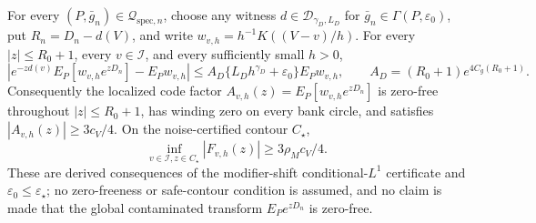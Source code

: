 For every \((P,\bar g_n)\in\mathcal Q_{\mathrm{spec},n}\), choose any witness \(d\in\mathcal D_{\gamma_D,L_D}\) for \(\bar g_n\in\Gamma(P,\varepsilon_0)\), put \(R_n=D_n-d(V)\), and write \(w_{v,h}=h^{-1}K((V-v)/h)\). For every \(|z|\le R_0+1\), every \(v\in\mathcal I\), and every sufficiently small \(h>0\),
\[
 \left|e^{-zd(v)}E_P[w_{v,h}e^{zD_n}]-E_Pw_{v,h}\right|
 \le A_D\{L_Dh^{\gamma_D}+\varepsilon_0\}E_Pw_{v,h},
 \qquad A_D=(R_0+1)e^{4C_g(R_0+1)}.
\]
Consequently the localized code factor \(A_{v,h}(z)=E_P[w_{v,h}e^{zD_n}]\) is zero-free throughout \(|z|\le R_0+1\), has winding zero on every bank circle, and satisfies \(|A_{v,h}(z)|\ge3c_V/4\). On the noise-certified contour \(C_\star\),
\[
 \inf_{v\in\mathcal I,z\in C_\star}|F_{v,h}(z)|
 \ge3\rho_Mc_V/4.
\]
These are derived consequences of the modifier-shift conditional-\(L^1\) certificate and \(\varepsilon_0\le\varepsilon_\star\); no zero-freeness or safe-contour condition is assumed, and no claim is made that the global contaminated transform \(E_Pe^{zD_n}\) is zero-free.